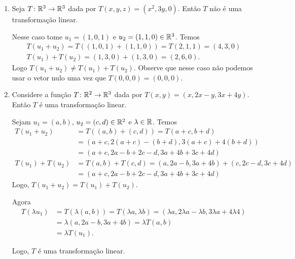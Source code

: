 \begin{exemplo}
\begin{enumerate}[label={\arabic*})]
        \item Seja $T \colon \mathbb{R}^3 \to \mathbb{R}^3$ dada por $T(x, y, z) = (x^2, 3y, 0)$. Então $T$ não é uma transformação linear.
        \begin{solucao}
            Nesse caso tome $u_1 = (1, 0, 1)$ e $u_2 = (1, 1, 0) \in \mathbb{R}^3$. Temos
            \begin{align*}
                T(u_1 + u_2) = T((1, 0, 1) + (1, 1, 0)) = T(2, 1, 1) = (4, 3, 0)\\
                T(u_1) + T(u_2) = (1, 3, 0) + (1, 3, 0) = (2, 6, 0).
            \end{align*}
            Logo $T(u_1 + u_2) \ne T(u_1) + T(u_2)$. Observe que nesse caso não podemos usar o vetor nulo uma vez que $T(0, 0, 0) = (0, 0, 0)$.
        \end{solucao}

        \item Considere a função $T \colon \mathbb{R}^2 \to \mathbb{R}^3$ dada por $T(x, y) = (x, 2x - y, 3x + 4y)$. Então $T$ é uma transformação linear.
        \begin{solucao}
            Sejam $u_1 = (a, b)$, $u_2 = (c, d) \in \mathbb{R}^2$ e $\lambda \in \mathbb{R}$. Temos
            \begin{align*}
                T(u_1 + u_ 2) &= T((a, b) + (c, d)) = T(a + c, b + d) \\ &= (a + c, 2(a + c) - (b + d), 3(a + c) + 4(b + d)) \\ &= (a + c, 2a - b + 2c - d, 3a + 4b + 3c + 4d)\\
                T(u_1) + T(u_2) &= T(a, b) + T(c, d) = (a, 2a - b, 3a + 4b) + (c, 2c - d, 3c + 4d) \\ &= (a + c, 2a - b + 2c - d, 3a + 4b + 3c + 4d)
            \end{align*}
            Logo, $T(u_1 + u_2) = T(u_1) + T(u_2)$.

            Agora
            \begin{align*}
                T(\lambda u_1) &= T(\lambda (a, b)) = T(\lambda a, \lambda b) = (\lambda a, 2\lambda a - \lambda b, 3\lambda a + 4\lambda 4) \\ &= \lambda (a, 2a - b, 3a + 4b) = \lambda T(a, b) \\ &= \lambda T(u_1).
            \end{align*}

            Logo, $T$ é uma transformação linear.
        \end{solucao}


\end{enumerate}
\end{exemplo}
